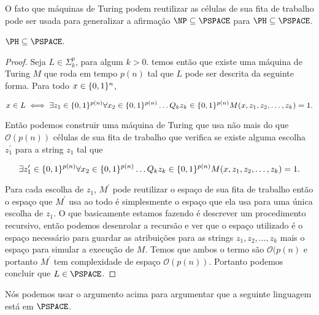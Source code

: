 O fato que máquinas de Turing podem reutilizar as células de sua fita de trabalho pode ser usada para generalizar a afirmação $\NP \subseteq \PSPACE$ para $\PH \subseteq \PSPACE$. 

\begin{teo} \label{ph_subset_pspace}

$\PH \subseteq \PSPACE$.

\end{teo}

\begin{proof}

    Seja $L \in \Sigma_{k}^{p}$, para algum $k > 0$. temos então que existe uma máquina de Turing $M$ que roda em tempo $p(n)$ tal que $L$ pode ser descrita da seguinte forma. Para todo $x \in \{0, 1\}^{n}$,
    
    \begin{equation*}
        x \in L \iff \exists z_{1} \in \{0, 1\}^{p(n)} \forall x_{2} \in \{0, 1\}^{p(n)} \dots Q_{k} z_{k} \in \{0, 1\}^{p(n)} M(x, z_{1}, z_{2}, \dots, z_{k}) = 1. 
    \end{equation*}
    
    Então podemos construir uma máquina de Turing que usa não mais do que $\mathcal{O}(p(n))$ células de sua fita de trabalho que verifica se existe alguma escolha $z_{1}^{\prime}$ para a string $z_{1}$ tal que
    
    \begin{equation*}
        \exists z_{1}^{\prime} \in \{0, 1\}^{p(n)} \forall x_{2} \in \{0, 1\}^{p(n)} \dots Q_{k} z_{k} \in \{0, 1\}^{p(n)} M(x, z_{1}, z_{2}, \dots, z_{k}) = 1.
    \end{equation*}

    Para cada escolha de $z_{1}$, $M^{\prime}$ pode reutilizar o espaço de sua fita de trabalho então o espaço que $M^{\prime}$ usa ao todo é simplesmente o espaço que ela usa para uma única escolha de $z_{1}$. O que basicamente estamos fazendo é descrever um procedimento recursivo, então podemos desenrolar a recursão e ver que o espaço utilizado é o espaço necessário para guardar as atribuições para as strings $z_{1}, z_{2}, \dots, z_{k}$ mais o espaço para simular a execução de $M$. Temos que ambos o termo são $\mathcal{O}(p(n)$ e portanto $M^{\prime}$ tem complexidade de espaço $\mathcal{O}(p(n))$. Portanto podemos concluir que $L \in \PSPACE$.

\end{proof}

Nós podemos usar o argumento acima para argumentar que a seguinte linguagem está em $\PSPACE$.

